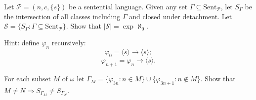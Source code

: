 Let $\mathcal{P} = (n, c, \{s\})$ be a sentential language. Given any set $\Gamma \subseteq \text{Sent}_{\mathcal{P}}$, let $S_\Gamma$ be the intersection of all classes including $\Gamma$ and closed under detachment. Let $\mathcal{S} = \{S_\Gamma : \Gamma \subseteq \text{Sent}_{\mathcal{P}}\}$. Show that $|\mathcal{S}| = \exp \aleph_0$.

Hint: define $\varphi_n$ recursively:
$$\varphi_0 = \langle s \rangle \rightarrow \langle s \rangle;$$
$$\varphi_{n+1} = \varphi_n \rightarrow \langle s \rangle.$$

For each subset $M$ of $\omega$ let $\Gamma_M = \{\varphi_{3n} : n \in M\} \cup \{\varphi_{3n+1} : n \notin M\}$. Show that $M \neq N \Rightarrow S_{\Gamma_M} \neq S_{\Gamma_N}$.
